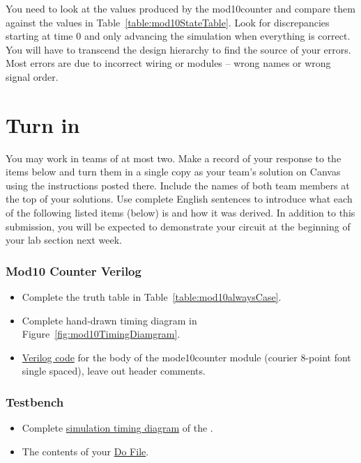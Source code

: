 You need to look at the values produced by the mod10counter and compare
them against the values in Table~\ref{table:mod10StateTable}. Look for discrepancies
starting at time 0 and only advancing the simulation when everything is
correct. You will have to transcend the design hierarchy to find the
source of your errors. Most errors are due to incorrect wiring or
modules -- wrong names or wrong signal order.


\section{Turn in}

You may work in teams of at most two. Make a record of your response to
the items below and turn them in a single copy as your team's solution
on Canvas using the instructions posted there. Include the names of both
team members at the top of your solutions. Use complete English
sentences to introduce what each of the following listed items (below)
is and how it was derived. In addition to this submission, you will be
expected to demonstrate your circuit at the beginning of your lab
section next week.

\subsubsection{Mod10 Counter Verilog}

\begin{itemize}
\item
  Complete the truth table in Table~\ref{table:mod10alwaysCase}.
\item
 Complete hand-drawn timing diagram in Figure~\ref{fig:mod10TimingDiamgram}.
\item
  \hyperlink{link:mod10Verilog}{Verilog code} for the body of the mode10counter module (courier 8-point
  font single spaced), leave out header comments.
  \end{itemize}
  
\subsubsection{Testbench}
\begin{itemize}
\item
  Complete \hyperlink{link:mod10Simulation}{simulation timing diagram} of the .
\item
  The contents of your   \hyperlink{link:mod10Simulation}{Do File}.
\end{itemize}

